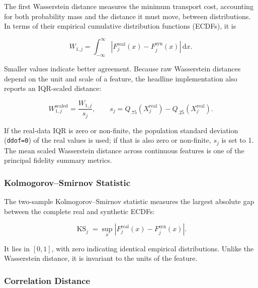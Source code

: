 The first Wasserstein distance measures the minimum transport cost, accounting
for both probability mass and the distance it must move, between distributions. In
terms of their empirical cumulative distribution functions (ECDFs), it is

\begin{equation}
    W_{1,j} = \int_{-\infty}^{\infty}
        \left|F_j^{\mathrm{real}}(x)-F_j^{\mathrm{syn}}(x)\right|\,\mathrm{d}x.
    \label{eq:evaluation_wasserstein}
\end{equation}

Smaller values indicate better agreement. Because raw Wasserstein distances
depend on the unit and scale of a feature, the headline implementation also
reports an IQR-scaled distance:

\begin{equation}
    W_{1,j}^{\mathrm{scaled}} = \frac{W_{1,j}}{s_j},
    \qquad
    s_j = Q_{.75}(X_j^{\mathrm{real}})-Q_{.25}(X_j^{\mathrm{real}}).
    \label{eq:evaluation_scaled_wasserstein}
\end{equation}

If the real-data IQR is zero or non-finite, the population standard deviation
(\texttt{ddof=0}) of the real values is used; if that
is also zero or non-finite, $s_j$ is set to 1. The mean scaled Wasserstein
distance across continuous features is one of the principal fidelity summary
metrics.

\subsubsection{Kolmogorov--Smirnov Statistic}

The two-sample Kolmogorov--Smirnov statistic measures the largest absolute gap
between the complete real and synthetic ECDFs:

\begin{equation}
    \operatorname{KS}_j = \sup_x
        \left|F_j^{\mathrm{real}}(x)-F_j^{\mathrm{syn}}(x)\right|.
    \label{eq:evaluation_ks}
\end{equation}

It lies in $[0,1]$, with zero indicating identical empirical distributions.
Unlike the Wasserstein distance, it is invariant to the units of the feature.

\subsubsection{Correlation Distance}

